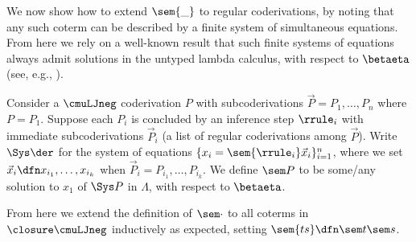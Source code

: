  We now show how to extend  $\sem{\_}$ to regular coderivations, by noting that any such coterm can be described by a finite system of simultaneous equations. 
 From here we rely on a well-known result that such finite systems of equations always admit solutions in the untyped lambda calculus, with respect to $\betaeta$ (see, e.g., \cite{Hindley}).

 \begin{definition}
     Consider a $\cmuLJneg$ coderivation $P$ with subcoderivations $\vec P = P_1, \dots , P_n$ where $P = P_1$.
 Suppose each $P_i$ is concluded by an inference step $\rrule_i$ with immediate subcoderivations $\vec P_i$ (a list of regular coderivations among $\vec P$).
 Write $\Sys \der$ for the system of equations $\{x_i = \sem{\rrule_i} \vec x_i\}_{i=1}^n$, where we set $\vec x_i \dfn x_{i_1}, \dots, x_{i_k}$ when $\vec P_i = P_{i_1},\dots, P_{i_k}$.
% 
We define $\sem P$ to be some/any solution to $x_1$ of $\Sys P$ in $\Lambda$, with respect to $\betaeta$.

 From here we extend the definition of $\sem\cdot $ to all coterms in $\closure \cmuLJneg$ inductively as expected, setting $\sem{ts}\dfn \sem t \sem s$.
 \end{definition}


 
